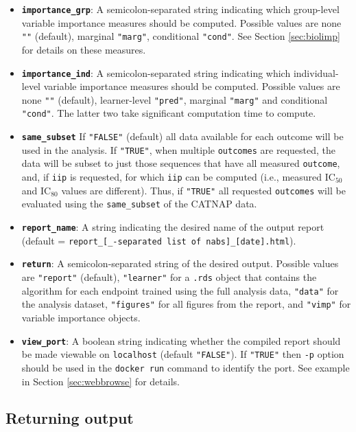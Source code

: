 \documentclass[]{article}
\begin{document}
\begin{itemize}
\item
  \textbf{\texttt{importance\_grp}}: A semicolon-separated string
  indicating which group-level variable importance measures should be
  computed. Possible values are none \texttt{""} (default), marginal
  \texttt{"marg"}, conditional \texttt{"cond"}. See Section
  \ref{sec:biolimp} for details on these measures.
\item
  \textbf{\texttt{importance\_ind}}: A semicolon-separated string
  indicating which individual-level variable importance measures should
  be computed. Possible values are none \texttt{""} (default),
  learner-level \texttt{"pred"}, marginal \texttt{"marg"} and
  conditional \texttt{"cond"}. The latter two take significant
  computation time to compute.
\item
  \textbf{\texttt{same\_subset}} If \texttt{"FALSE"} (default) all data
  available for each outcome will be used in the analysis. If
  \texttt{"TRUE"}, when multiple \texttt{outcomes} are requested, the
  data will be subset to just those sequences that have all measured
  \texttt{outcome}, and, if \texttt{iip} is requested, for which
  \texttt{iip} can be computed (i.e., measured IC\(_{50}\) and
  IC\(_{80}\) values are different). Thus, if \texttt{"TRUE"} all
  requested \texttt{outcomes} will be evaluated using the
  \texttt{same\_subset} of the CATNAP data.
\item
  \textbf{\texttt{report\_name}}: A string indicating the desired name
  of the output report (default =
  \texttt{report\_{[}\_-separated\ list\ of\ nabs{]}\_{[}date{]}.html}).
\item
  \textbf{\texttt{return}}: A semicolon-separated string of the desired
  output. Possible values are \texttt{"report"} (default),
  \texttt{"learner"} for a \texttt{.rds} object that contains the
  algorithm for each endpoint trained using the full analysis data,
  \texttt{"data"} for the analysis dataset, \texttt{"figures"} for all
  figures from the report, and \texttt{"vimp"} for variable importance
  objects.
\item
  \textbf{\texttt{view\_port}}: A boolean string indicating whether the
  compiled report should be made viewable on \texttt{localhost} (default
  \texttt{"FALSE"}). If \texttt{"TRUE"} then \texttt{-p} option should
  be used in the \texttt{docker\ run} command to identify the port. See
  example in Section \ref{sec:webbrowse} for details.
\end{itemize}

\subsection{Returning output}\label{returning-output}
\end{document}
